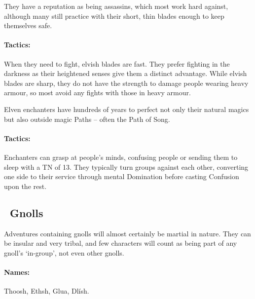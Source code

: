 \begin{multicols}{2}
They have a reputation as being assassins, which most work hard against, although many still practice with their short, thin blades enough to keep themselves safe.

\paragraph{Tactics:} When they need to fight, elvish blades are fast.
They prefer fighting in the darkness as their heightened senses give them a distinct advantage.
While elvish blades are sharp, they do not have the strength to damage people wearing heavy armour, so most avoid any fights with those in heavy armour.


\label{elven_enchanter}

Elven enchanters have hundreds of years to perfect not only their natural magics but also outside magic Paths -- often the Path of Song.


\paragraph{Tactics:} Enchanters can grasp at people's minds, confusing people or sending them to sleep with a TN of 13.
They typically turn groups against each other, converting one side to their service through mental Domination before casting Confusion upon the rest.

\subsection[Gnolls]{\Nl\ Gnolls}
\label{best_gnolls}

\label{gnoll_hunter}

Adventures containing gnolls will almost certainly be martial in nature.  They can be insular and very tribal, and few characters will count as being part of any gnoll's `in-group', not even other gnolls.

\paragraph{Names:} Thoosh, Ethsh, Glua, Dl\'{i}sh.




\end{multicols}

